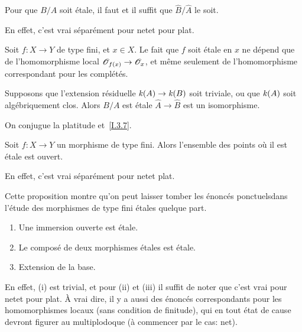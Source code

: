 \begin{proposition}
\label{I.4.2}
Pour que $B/A$ soit \'etale, il faut et il suffit que
$\widehat{B}/\widehat{A}$ le soit.
\end{proposition}

En
effet, c'est vrai s\'epar\'ement pour \og net\fg et pour \og plat\fg.

\begin{corollaire}
\label{I.4.3}
Soit $f\colon X\to Y$ de type fini, et $x\in X$. Le fait que $f$ soit
\'etale en $x$ ne d\'epend que de l'homomorphisme local
$\cal{O}_{f(x)}\to \cal{O}_x$, et m\^eme seulement de
l'homomorphisme correspondant pour les compl\'et\'es.
\end{corollaire}

\begin{corollaire}
\label{I.4.4}
Supposons que l'extension r\'esiduelle $\kres(A)\to \kres(B)$ soit triviale,
ou que $\mathit{k}(A)$ soit alg\'ebriquement clos. Alors $B/A$ est \'etale
\sss $\widehat{A}\to\widehat{B}$ est un isomorphisme.
\end{corollaire}

On conjugue la platitude et~\ref{I.3.7}.
\begin{proposition}
\label{I.4.5}
Soit $f\colon X\to Y$ un morphisme de type fini. Alors l'ensemble des
points o\`u il est \'etale est ouvert.
\end{proposition}

En effet, c'est vrai s\'epar\'ement pour \og net\fg et \og plat\fg.

Cette proposition montre qu'on peut laisser tomber les \'enonc\'es
\og ponctuels\fg dans l'\'etude des morphismes de type fini \'etales
quelque part.
\begin{proposition}
\label{I.4.6}
\begin{enumerate}
\item[(i)] Une immersion ouverte est \'etale.
\item[(ii)] Le compos\'e de deux morphismes \'etales est
\'etale.
\item[(iii)] Extension de la base.
\end{enumerate}
\end{proposition}

En effet, (i) est trivial, et pour (ii) et (iii) il suffit de noter
que c'est vrai pour \og net\fg et pour \og plat\fg. \`A vrai dire, il y a
aussi des \'enonc\'es correspondants pour les homomorphismes
locaux (sans condition de finitude), qui en tout \'etat de cause
devront figurer au multiplodoque (\`a commencer par le cas: net).

